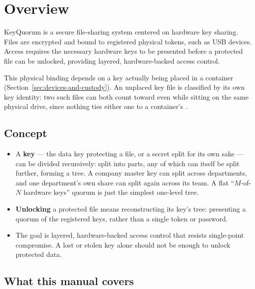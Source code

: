\section{Overview}
\label{sec:overview}

KeyQuorum is a secure file-sharing system centered on hardware key sharing.
Files are encrypted and bound to registered physical tokens, such as USB
devices. Access requires the necessary hardware keys to be presented before
a protected file can be unlocked, providing layered, hardware-backed access
control.

\begin{noteBox}
This physical binding depends on a key actually being placed in a
 container (Section~\ref{sec:devices-and-custody}).
An unplaced  key file is classified by its own key
identity: two such files can both count toward
 even while sitting on the same physical
drive, since nothing ties either one to a container's .
\end{noteBox}

\subsection{Concept}

\begin{itemize}
  \item A \textbf{key} --- the data key protecting a file, or a secret split
  for its own sake --- can be divided recursively: split into parts, any of
  which can itself be split further, forming a tree. A company master key
  can split across departments, and one department's own share can split
  again across its team. A flat ``$M$-of-$N$ hardware keys'' quorum is just
  the simplest one-level tree.
  \item \textbf{Unlocking} a protected file means reconstructing its key's
  tree: presenting a quorum of the registered keys, rather than a single
  token or password.
  \item The goal is layered, hardware-backed access control that resists
  single-point compromise. A lost or stolen key alone should not be enough
  to unlock protected data.
\end{itemize}

\subsection{What this manual covers}


